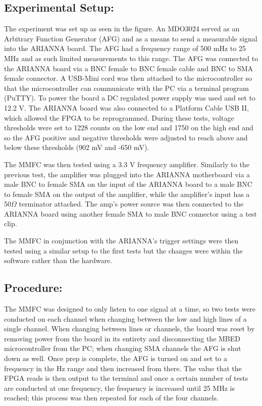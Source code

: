 \documentclass[journal]{IEEEtran}
\begin{document}
\subsection{Experimental Setup:}
The experiment was set up as seen in the figure.  An MDO3024  served as an Arbitrary Function Generator (AFG) and as a means to send a measurable signal into the ARIANNA board.  The AFG had a frequency range of 500 mHz to 25 MHz and as such limited measurements to this range.  The AFG was connected to the ARIANNA board via a BNC female to BNC female cable and BNC to SMA female connector.  A USB-Mini cord was then attached to the microcontroller so that the microcontroller can communicate with the PC via a terminal program (PuTTY).  To power the board a DC regulated power supply was used and set to 12.2 V.  The ARIANNA board was also connected to a Platform Cable USB II, which allowed the FPGA to be reprogrammed.  During these tests, voltage thresholds were set to 1228 counts on the low end and 1750 on the high end and so the AFG positive and negative thresholds were adjusted to reach above and below these thresholds (902 mV and -650 mV).  

The MMFC was then tested using a 3.3 V frequency amplifier.  Similarly to the previous test, the amplifier was plugged into the ARIANNA motherboard via a male BNC to female SMA on the input of the ARIANNA board to a male BNC to female SMA on the output of the amplifier, while the amplifier’s input has a $50\Omega$ terminator attached.  The amp’s power source was then connected to the ARIANNA board using another female SMA to male BNC connector using a test clip.  

The MMFC in conjunction with the ARIANNA’s trigger settings were then tested using a similar setup to the first tests but the changes were within the software rather than the hardware.
\subsection{Procedure:}
The MMFC was designed to only listen to one signal at a time, so two tests were conducted on each channel when changing between the low and high lines of a single channel.  When changing between lines or channels, the board was reset by removing power from the board in its entirety and disconnecting the MBED microcontroller from the PC; when changing SMA channels the AFG is shut down as well.  Once prep is complete, the AFG is turned on and set to a frequency in the Hz range and then increased from there.  The value that the FPGA reads is then output to the terminal and once a certain number of tests are conducted at one frequency, the frequency is increased until 25 MHz is reached; this process was then repeated for each of the four channels. 
	 
\end{document}
